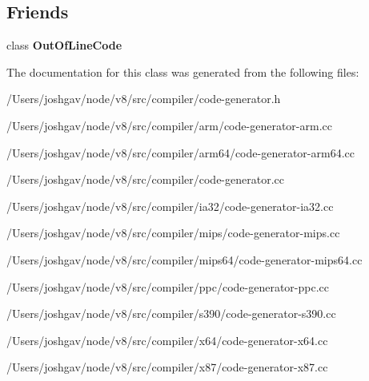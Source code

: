 \subsection*{Friends}
\begin{DoxyCompactItemize}
\item 
class {\bfseries Out\+Of\+Line\+Code}\hypertarget{classv8_1_1internal_1_1compiler_1_1_code_generator_abbc0d1dda26f4692c37dbc47aa30debd}{}\label{classv8_1_1internal_1_1compiler_1_1_code_generator_abbc0d1dda26f4692c37dbc47aa30debd}

\end{DoxyCompactItemize}


The documentation for this class was generated from the following files\+:\begin{DoxyCompactItemize}
\item 
/\+Users/joshgav/node/v8/src/compiler/code-\/generator.\+h\item 
/\+Users/joshgav/node/v8/src/compiler/arm/code-\/generator-\/arm.\+cc\item 
/\+Users/joshgav/node/v8/src/compiler/arm64/code-\/generator-\/arm64.\+cc\item 
/\+Users/joshgav/node/v8/src/compiler/code-\/generator.\+cc\item 
/\+Users/joshgav/node/v8/src/compiler/ia32/code-\/generator-\/ia32.\+cc\item 
/\+Users/joshgav/node/v8/src/compiler/mips/code-\/generator-\/mips.\+cc\item 
/\+Users/joshgav/node/v8/src/compiler/mips64/code-\/generator-\/mips64.\+cc\item 
/\+Users/joshgav/node/v8/src/compiler/ppc/code-\/generator-\/ppc.\+cc\item 
/\+Users/joshgav/node/v8/src/compiler/s390/code-\/generator-\/s390.\+cc\item 
/\+Users/joshgav/node/v8/src/compiler/x64/code-\/generator-\/x64.\+cc\item 
/\+Users/joshgav/node/v8/src/compiler/x87/code-\/generator-\/x87.\+cc\end{DoxyCompactItemize}
